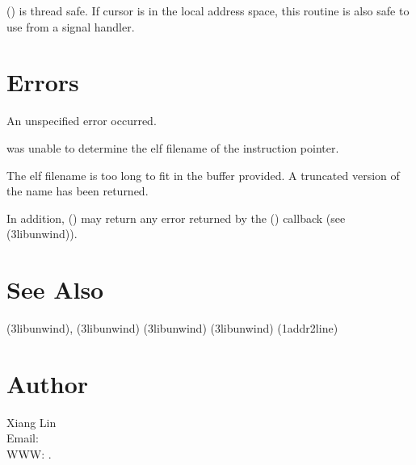 \documentclass{article}
\begin{document}
() is thread safe.  If cursor  is
in the local address space, this routine is also safe to use from a
signal handler.

\section{Errors}

\begin{Description}
\item[\Const{UNW\_EUNSPEC}] An unspecified error occurred.
\item[\Const{UNW\_ENOINFO}]  was unable to determine
  the elf filename of the instruction pointer.
\item[\Const{UNW\_ENOMEM}] The elf filename is too long to fit
  in the buffer provided.  A truncated version of the name has been
  returned.
\end{Description}
In addition, () may return any error
returned by the () callback (see
(3libunwind)).

\section{See Also}

(3libunwind),
(3libunwind)
(3libunwind)
(3libunwind)
(1addr2line)

\section{Author}

\noindent
Xiang Lin\\
Email: \\
WWW: .
\LatexManEnd
\end{document}
